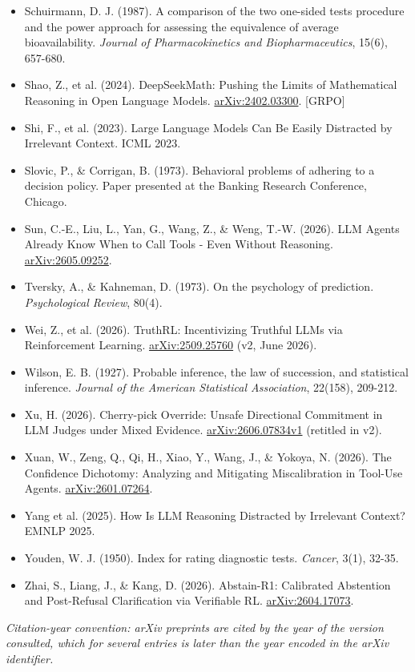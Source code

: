 \documentclass[10pt]{article}
\begin{document}
\begin{itemize}[leftmargin=1.6em,itemsep=3pt,label=\textbullet]
\item Schuirmann, D. J. (1987). A comparison of the two one-sided tests procedure and the power approach for assessing the equivalence of average bioavailability. \textit{Journal of Pharmacokinetics and Biopharmaceutics}, 15(6), 657-680.

\item Shao, Z., et al. (2024). DeepSeekMath: Pushing the Limits of Mathematical Reasoning in Open Language Models. \href{https://arxiv.org/abs/2402.03300}{arXiv:2402.03300}. [GRPO]

\item Shi, F., et al. (2023). Large Language Models Can Be Easily Distracted by Irrelevant Context. ICML 2023.

\item Slovic, P., \& Corrigan, B. (1973). Behavioral problems of adhering to a decision policy. Paper presented at the Banking Research Conference, Chicago.

\item Sun, C.-E., Liu, L., Yan, G., Wang, Z., \& Weng, T.-W. (2026). LLM Agents Already Know When to Call Tools - Even Without Reasoning. \href{https://arxiv.org/abs/2605.09252}{arXiv:2605.09252}.

\item Tversky, A., \& Kahneman, D. (1973). On the psychology of prediction. \textit{Psychological Review}, 80(4).

\item Wei, Z., et al. (2026). TruthRL: Incentivizing Truthful LLMs via Reinforcement Learning. \href{https://arxiv.org/abs/2509.25760}{arXiv:2509.25760} (v2, June 2026).

\item Wilson, E. B. (1927). Probable inference, the law of succession, and statistical inference. \textit{Journal of the American Statistical Association}, 22(158), 209-212.

\item Xu, H. (2026). Cherry-pick Override: Unsafe Directional Commitment in LLM Judges under Mixed Evidence. \href{https://arxiv.org/abs/2606.07834v1}{arXiv:2606.07834v1} (retitled in v2).

\item Xuan, W., Zeng, Q., Qi, H., Xiao, Y., Wang, J., \& Yokoya, N. (2026). The Confidence Dichotomy: Analyzing and Mitigating Miscalibration in Tool-Use Agents. \href{https://arxiv.org/abs/2601.07264}{arXiv:2601.07264}.

\item Yang et al. (2025). How Is LLM Reasoning Distracted by Irrelevant Context? EMNLP 2025.

\item Youden, W. J. (1950). Index for rating diagnostic tests. \textit{Cancer}, 3(1), 32-35.

\item Zhai, S., Liang, J., \& Kang, D. (2026). Abstain-R1: Calibrated Abstention and Post-Refusal Clarification via Verifiable RL. \href{https://arxiv.org/abs/2604.17073}{arXiv:2604.17073}.

\end{itemize}

\vspace{4pt}
\small\textit{Citation-year convention: arXiv preprints are cited by the year of the version consulted, which
for several entries is later than the year encoded in the arXiv identifier.}
\end{document}
